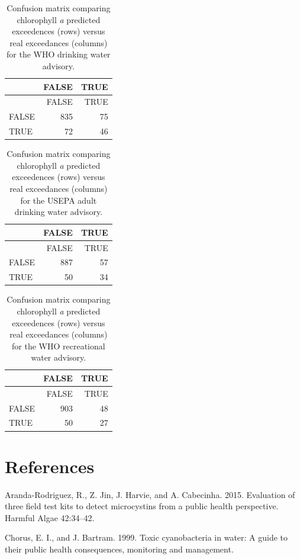 \documentclass[11pt,]{article}
\begin{document}
\newpage

\begin{longtable}[c]{@{}lrr@{}}
\caption{Confusion matrix comparing chlorophyll \textit{a} predicted
exceedences (rows) versus real exceedances (columns) for the WHO
drinking water advisory.
\label{tab:who_drink_conmat_table}}\tabularnewline
\toprule
& FALSE & TRUE\tabularnewline
\midrule
\endfirsthead
\toprule
& FALSE & TRUE\tabularnewline
\midrule
\endhead
FALSE & 835 & 75\tabularnewline
TRUE & 72 & 46\tabularnewline
\bottomrule
\end{longtable}

\newpage

\begin{longtable}[c]{@{}lrr@{}}
\caption{Confusion matrix comparing chlorophyll \textit{a} predicted
exceedences (rows) versus real exceedances (columns) for the USEPA adult
drinking water advisory. \label{tab:adult_conmat_table}}\tabularnewline
\toprule
& FALSE & TRUE\tabularnewline
\midrule
\endfirsthead
\toprule
& FALSE & TRUE\tabularnewline
\midrule
\endhead
FALSE & 887 & 57\tabularnewline
TRUE & 50 & 34\tabularnewline
\bottomrule
\end{longtable}

\newpage

\begin{longtable}[c]{@{}lrr@{}}
\caption{Confusion matrix comparing chlorophyll \textit{a} predicted
exceedences (rows) versus real exceedances (columns) for the WHO
recreational water advisory.
\label{tab:who_rec_conmat_table}}\tabularnewline
\toprule
& FALSE & TRUE\tabularnewline
\midrule
\endfirsthead
\toprule
& FALSE & TRUE\tabularnewline
\midrule
\endhead
FALSE & 903 & 48\tabularnewline
TRUE & 50 & 27\tabularnewline
\bottomrule
\end{longtable}

\newpage

\section*{References}\label{references}

Aranda-Rodriguez, R., Z. Jin, J. Harvie, and A. Cabecinha. 2015.
Evaluation of three field test kits to detect microcystins from a public
health perspective. Harmful Algae 42:34--42.

Chorus, E. I., and J. Bartram. 1999. Toxic cyanobacteria in water: A
guide to their public health consequences, monitoring and management.
\end{document}
